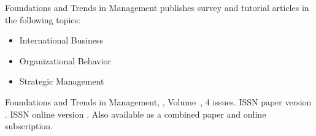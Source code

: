 


\journalaimsandscope
 {%
  Foundations and Trends\textsuperscript{\textregistered} in
  Management publishes
 survey and tutorial articles in the following topics:
 \begin{itemize}
\item{International Business}
\item{Organizational Behavior}
\item{Strategic Management}
\end{itemize}
 }


\journallibraryinfo
 {%
  Foundations and Trends\textsuperscript{\textregistered} in
  Management, ,
  Volume~, 4 issues.
  ISSN paper version .
  ISSN online version .
  Also available as a combined paper and online
  subscription.
 } 